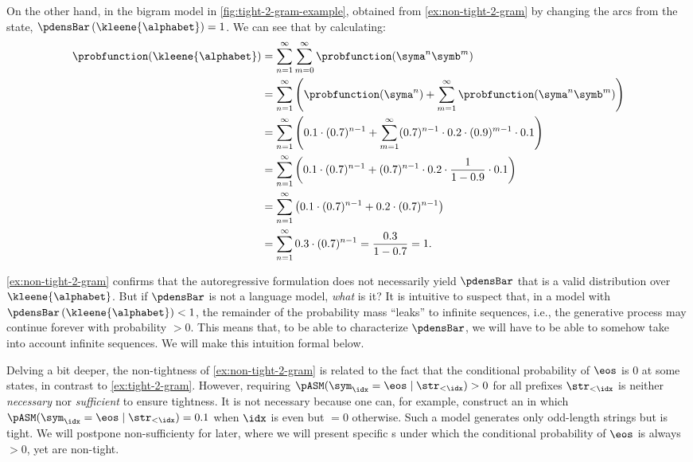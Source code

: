 \begin{example} \label{ex:tight-2-gram}
On the other hand, in the bigram model in \cref{fig:tight-2-gram-example}, obtained from \cref{ex:non-tight-2-gram} by changing the arcs from the \symb{} state, $\pdensBar\left(\kleene{\alphabet}\right)=1$. 
We can see that by calculating:
\begin{align*}
    \probfunction(\kleene{\alphabet})
    &=\sum_{n=1}^\infty\sum_{m=0}^\infty \probfunction(\syma^n\symb^m) \\
    &= \sum_{n=1}^\infty \left(\probfunction(\syma^n)+\sum_{m=1}^\infty \probfunction(\syma^n\symb^m) \right) \\
    &= \sum_{n=1}^\infty \left(0.1\cdot(0.7)^{n-1} + \sum_{m=1}^\infty (0.7)^{n-1}\cdot 0.2 \cdot (0.9)^{m-1} \cdot 0.1 \right) \\
    &= \sum_{n=1}^\infty \left(0.1\cdot(0.7)^{n-1} + (0.7)^{n-1}\cdot 0.2 \cdot \frac{1}{1-0.9} \cdot 0.1 \right) \\
    &= \sum_{n=1}^\infty \left(0.1\cdot(0.7)^{n-1} + 0.2 \cdot (0.7)^{n-1}\right) \\
    &= \sum_{n=1}^\infty 0.3\cdot (0.7)^{n-1}=\frac{0.3}{1-0.7} = 1.
\end{align*}
\end{example}

\cref{ex:non-tight-2-gram} confirms that the autoregressive formulation does not necessarily yield $\pdensBar$ that is a valid distribution over $\kleene{\alphabet}$.
But if $\pdensBar$ is not a language model, \emph{what} is it?
It is intuitive to suspect that, in a model with $\pdensBar\left(\kleene{\alphabet}\right)<1$, the remainder of the probability mass ``leaks'' to infinite sequences, i.e., the generative process may continue forever with probability $>0$. 
This means that, to be able to characterize $\pdensBar$, we will have to be able to somehow take into account infinite sequences.
We will make this intuition formal below.

Delving a bit deeper, the non-tightness of \cref{ex:non-tight-2-gram} is related to the fact that the conditional probability of $\eos$ is $0$ at some states, in contrast to \cref{ex:tight-2-gram}. 
However, requiring $\pASM(\sym_\idx=\eos \mid \str_{<\idx}) > 0$ for all prefixes $\str_{<\idx}$ is neither \emph{necessary} nor \emph{sufficient} to ensure tightness. 
It is not necessary because one can, for example, construct an \autoregmodelAcronym 
in which $\pASM(\sym_\idx=\eos \mid \str_{<\idx}) = 0.1$ when $\idx$ is even but $= 0$ otherwise.  Such a model generates only odd-length strings but is tight.
We will postpone non-sufficienty for later, where we will present specific \autoregmodelAcronym{}s under which the conditional probability of $\eos$ is always $>0$, yet are non-tight.

